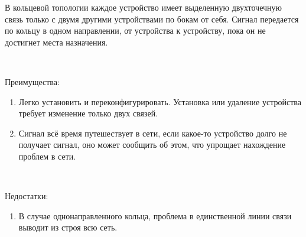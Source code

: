В кольцевой топологии каждое устройство имеет выделенную двухточечную связь только с двумя другими устройствами по бокам от себя. Сигнал передается по кольцу в одном направлении, от устройства к устройству, пока он не достигнет места назначения. 

\

Преимущества: \\
\begin{enumerate}
  \item Легко установить и переконфигурировать. Установка или удаление устройства требует изменение только двух связей. 
  \item Сигнал всё время путешествует в сети, если какое-то устройство долго не получает сигнал, оно может сообщить об этом, что упрощает нахождение проблем в сети.
\end{enumerate}
\

Недостатки: \\
\begin{enumerate}
  \item В случае однонаправленного кольца, проблема в единственной линии связи выводит из строя всю сеть.
\end{enumerate}
\



